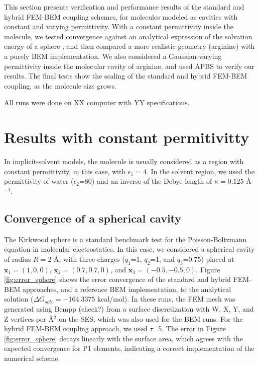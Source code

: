 This section presents verification and performance results of the standard and hybrid FEM-BEM coupling schemes, for molecules modeled as cavities with constant and varying permittivity.
With a constant permittivity inside the molecule, we tested convergence against an analytical expression of the solvation energy of a sphere \cite{Kirkwood1934}, and then compared a more realistic geometry (arginine) with a purely BEM implementation.
We also considered a Gaussian-varying permittivity\cite{grant2001smooth,li2013dielectric} inside the molecular cavity of arginine, and used APBS \cite{BakerETal2001} to verify our results.
The final tests show the scaling of the standard and hybrid FEM-BEM coupling, as the molecule size grows. 

All runs were done on XX computer with YY specifications. 

\section*{\sffamily \Large Results with constant permitivitty}

In implicit-solvent models, the molecule is usually considered as a region with constant permittivity, in this case, with $\epsilon_1=4$.
In the solvent region, we used the permittivity of water ($\epsilon_2$=80) and an inverse of the Debye length of $\kappa=0.125$ \AA$^{-1}$.

\subsection*{\sffamily \large Convergence of a spherical cavity}

The Kirkwood sphere \cite{Kirkwood1934} is a standard benchmark test for the Poisson-Boltzmann equation in molecular electrostatics. 
In this case, we considered a spherical cavity of radius $R=2$ \AA, with three charges ($q_1$=1, $q_2$=1, and $q_3$=0.75) placed at $\mathbf{x}_1=(1,0,0)$, $\mathbf{x}_2=(0.7,0.7,0)$, and $\mathbf{x}_3=(-0.5,-0.5,0)$.
Figure \ref{fig:error_sphere} shows the error convergence of the standard and hybrid FEM-BEM approaches, and a reference BEM implementation, to the analytical solution ($\Delta G_{solv}= -164.3375$ kcal/mol). 
In these runs, the FEM mesh was generated using Bempp (check?) from a surface discretization with W, X, Y, and Z vertices per \AA$^2$ on the SES, which was also used for the BEM runs. 
For the hybrid FEM-BEM coupling approach, we used $\tau$=5.
The error in Figure \ref{fig:error_sphere} decays linearly with the surface area, which agrees with the expected convergence for P1 elements, indicating a correct implementation of the numerical scheme. 


